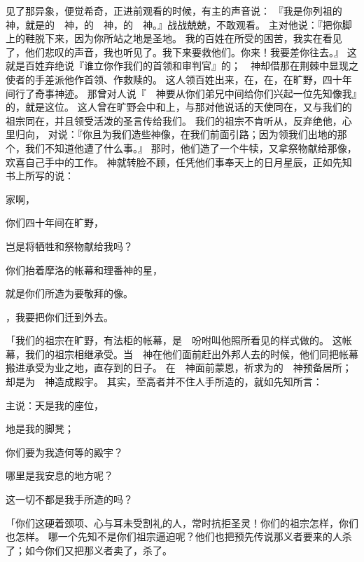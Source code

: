 {见了那异象，便觉希奇，正进前观看的时候，有主的声音说：
『我是你列祖的　神，就是{}的　神，{}的　神，{}的　神。』{}战战兢兢，不敢观看。
主对他说：『把你脚上的鞋脱下来，因为你所站之地是圣地。
我的百姓在{}所受的困苦，我实在看见了，他们悲叹的声音，我也听见了。我下来要救他们。你来！我要差你往{}去。』
这{}就是百姓弃绝说『谁立你作我们的首领和审判官』的；　神却借那在荆棘中显现之使者的手差派他作首领、作救赎的。
这人领百姓出来，在{}，在{}，在旷野，四十年间行了奇事神迹。
那曾对{}人说『　神要从你们弟兄中间给你们兴起一位先知像我』的，就是这位{}。
这人曾在旷野会中和{}上，与那对他说话的天使同在，又与我们的祖宗同在，并且领受活泼的圣言传给我们。
我们的祖宗不肯听从，反弃绝他，心里归向{}，
对{}说：『你且为我们造些神像，在我们前面引路；因为领我们出{}地的那个{}，我们不知道他遭了什么事。』
那时，他们造了一个牛犊，又拿祭物献给那像，欢喜自己手中的工作。
神就转脸不顾，任凭他们事奉天上的日月星辰，正如先知书上所写的说：
\par }{家啊，
\par }{\Q 你们四十年间在旷野，
\par }{\Q 岂是将牺牲和祭物献给我吗？
\par }{\Q {}你们抬着摩洛的帐幕和理番神的星，
\par }{\Q 就是你们所造为要敬拜的像。
\par }{，我要把你们迁到{}外去。
\par }{\PP {}「我们的祖宗在旷野，有法柜的帐幕，是　{}吩咐{}叫他照所看见的样式做的。
这帐幕，我们的祖宗相继承受。当　神在他们面前赶出外邦人去的时候，他们同{}把帐幕搬进承受为业之地，直存到{}的日子。
在　神面前蒙恩，祈求为{}的　神预备居所；
却是{}为　神造成殿宇。
其实，至高者并不住人手所造的，就如先知所言：
\par }{\PP {}主说：天是我的座位，
\par }{\Q 地是我的脚凳；
\par }{\Q 你们要为我造何等的殿宇？
\par }{\Q 哪里是我安息的地方呢？
\par }{\Q {}这一切不都是我手所造的吗？
\par }{\PP {}「你们这硬着颈项、心与耳未受割礼的人，常时抗拒圣灵！你们的祖宗怎样，你们也怎样。
哪一个先知不是你们祖宗逼迫呢？他们也把预先传说那义者要来的人杀了；如今你们又把那义者卖了，杀了。
}
